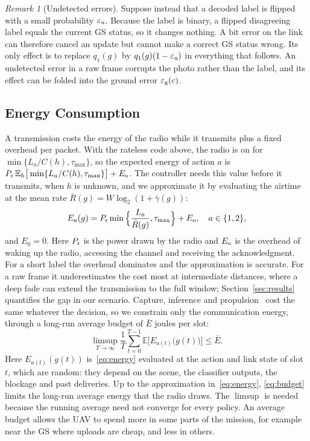 \documentclass[journal]{IEEEtran}
\theoremstyle{remark}
\newtheorem{remark}{Remark}
\newcommand{\E}{\mathbb{E}}
\newcommand{\ee}{\varepsilon}
\begin{document}
\begin{remark}[Undetected errors]\label{rem:flip}
Suppose instead that a decoded label is flipped with a small probability $\ee_{\rm u}$. Because the label is binary, a flipped disagreeing label equals the current GS status, so it changes nothing. A bit error on the link can therefore cancel an update but cannot make a correct GS status wrong. Its only effect is to replace $q_1(g)$ by $q_1(g)(1-\ee_{\rm u})$ in everything that follows. An undetected error in a raw frame corrupts the photo rather than the label, and its effect can be folded into the ground error $\ee_{\rm g}(c)$.
\end{remark}

\subsection{Energy Consumption}
A transmission costs the energy of the radio while it transmits plus a fixed overhead per packet. With the rateless code above, the radio is on for $\min\{L_a/C(h),\tau_{\max}\}$, so the expected energy of action $a$ is $P_{\rm r}\,\E_h\big[\min\{L_a/C(h),\tau_{\max}\}\big]+E_{\rm o}$. The controller needs this value before it transmits, when $h$ is unknown, and we approximate it by evaluating the airtime at the mean rate $\bar R(g)=W\log_2(1+\bar\gamma(g))$:
\begin{equation}\label{eq:energy}
E_a(g)=P_{\rm r}\min\Big\{\frac{L_a}{\bar R(g)},\tau_{\max}\Big\}+E_{\rm o},\quad a\in\{1,2\},
\end{equation}
and $E_0=0$. Here $P_{\rm r}$ is the power drawn by the radio and $E_{\rm o}$ is the overhead of waking up the radio, accessing the channel and receiving the acknowledgment. For a short label the overhead dominates and the approximation is accurate. For a raw frame it underestimates the cost most at intermediate distances, where a deep fade can extend the transmission to the full window; Section~\ref{sec:results} quantifies the gap in our scenario. Capture, inference and propulsion~\cite{zeng2019rotary} cost the same whatever the decision, so we constrain only the communication energy, through a long-run average budget of $\bar E$ joules per slot:
\begin{equation}\label{eq:budget}
\limsup_{T\to\infty}\frac1T\sum_{t=0}^{T-1}\E\Big[E_{a(t)}\big(g(t)\big)\Big]\le\bar E.
\end{equation}
Here $E_{a(t)}(g(t))$ is~\eqref{eq:energy} evaluated at the action and link state of slot $t$, which are random: they depend on the scene, the classifier outputs, the blockage and past deliveries. Up to the approximation in~\eqref{eq:energy}, \eqref{eq:budget} limits the long-run average energy that the radio draws. The $\limsup$ is needed because the running average need not converge for every policy. An average budget allows the UAV to spend more in some parts of the mission, for example near the GS where uploads are cheap, and less in others.
\end{document}

